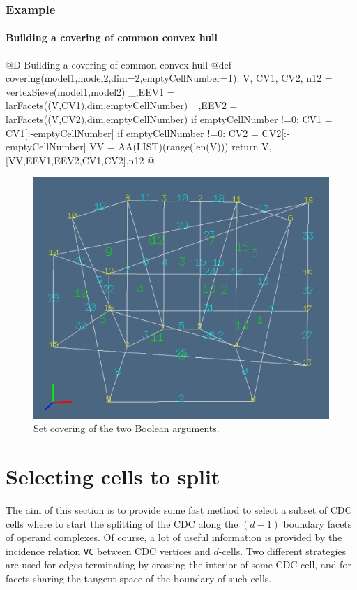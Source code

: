 \documentclass[11pt,oneside]{article}	%
\begin{document}
\subsubsection{Example}

\paragraph{Building a covering of common convex hull}

@D Building a covering of common convex hull
@{def covering(model1,model2,dim=2,emptyCellNumber=1):
	V, CV1, CV2, n12 = vertexSieve(model1,model2)
	_,EEV1 = larFacets((V,CV1),dim,emptyCellNumber)
	_,EEV2 = larFacets((V,CV2),dim,emptyCellNumber)
	if emptyCellNumber !=0: CV1 = CV1[:-emptyCellNumber]
	if emptyCellNumber !=0: CV2 = CV2[:-emptyCellNumber]
	VV = AA(LIST)(range(len(V)))
	return V,[VV,EEV1,EEV2,CV1,CV2],n12
@}

\begin{figure}[htbp] %
   \centering
   \includegraphics[width=0.6\linewidth]{images/covering} 
   \caption{Set covering of the two Boolean arguments.}
   \label{fig:example}
\end{figure}




\section{Selecting cells to split}

The aim of this section is to provide some fast method to select a subset of CDC cells where to start the 
splitting of the CDC along the $(d-1)$ boundary facets of operand complexes. Of course,  a lot of useful information is provided  by the incidence relation \texttt{VC} between CDC vertices and $d$-cells. Two different strategies are used for edges terminating by crossing the interior of some CDC cell, and for facets sharing the tangent space of the boundary of such cells.
\end{document}
